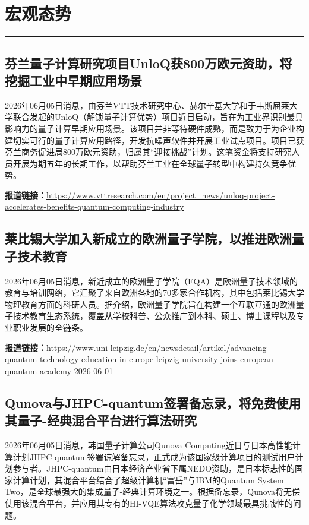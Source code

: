 \documentclass[12pt,a4paper]{ctexart}
\begin{document}
\newpage
\section{宏观态势}
\vspace{-0.5em}
\noindent\rule{\linewidth}{1.5pt}

\subsection{ 芬兰量子计算研究项目UnloQ获800万欧元资助，将挖掘工业中早期应用场景 }

2026年06月05日消息，由芬兰VTT技术研究中心、赫尔辛基大学和于韦斯屈莱大学联合发起的UnloQ（解锁量子计算优势）项目近日启动，旨在为工业界识别最具影响力的量子计算早期应用场景。该项目并非等待硬件成熟，而是致力于为企业构建切实可行的量子计算应用路径，开发抗噪声软件并开展工业试点项目。项目已获芬兰商务促进局800万欧元资助，归属其“迎接挑战”计划。这笔资金将支持研究人员开展为期五年的长期工作，以帮助芬兰工业在全球量子转型中构建持久竞争优势。

\noindent\textbf{报道链接：}\url{https://www.vttresearch.com/en/project\_news/unloq-project-accelerates-benefits-quantum-computing-industry}

\subsection{ 莱比锡大学加入新成立的欧洲量子学院，以推进欧洲量子技术教育 }

2026年06月05日消息，新近成立的欧洲量子学院（EQA）是欧洲量子技术领域的教育与培训网络，它汇聚了来自欧洲各地的70多家合作机构，其中包括莱比锡大学物理教育方面的科研人员。据介绍，欧洲量子学院旨在构建一个互联互通的欧洲量子技术教育生态系统，覆盖从学校科普、公众推广到本科、硕士、博士课程以及专业职业发展的全链条。

\noindent\textbf{报道链接：}\url{https://www.uni-leipzig.de/en/newsdetail/artikel/advancing-quantum-technology-education-in-europe-leipzig-university-joins-european-quantum-academy-2026-06-01}

\subsection{ Qunova与JHPC-quantum签署备忘录，将免费使用其量子-经典混合平台进行算法研究 }

2026年06月05日消息，韩国量子计算公司Qunova Computing近日与日本高性能计算计划JHPC-quantum签署谅解备忘录，正式成为该国家级计算项目的测试用户计划参与者。JHPC-quantum由日本经济产业省下属NEDO资助，是日本标志性的国家计算计划，其混合平台结合了超级计算机“富岳”与IBM的Quantum System Two，是全球最强大的集成量子-经典计算环境之一。根据备忘录，Qunova将无偿使用该混合平台，并应用其专有的HI-VQE算法攻克量子化学领域最具挑战性的问题。
\end{document}
